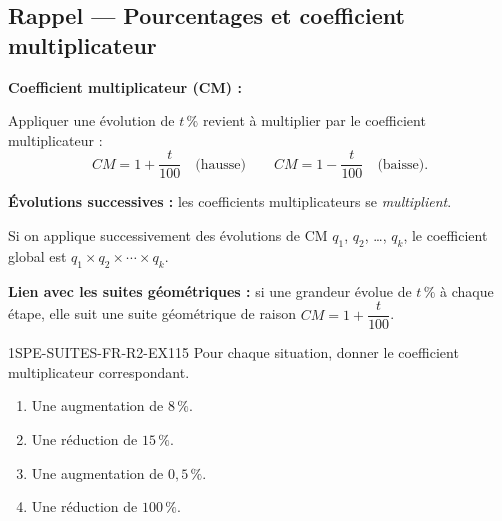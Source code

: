 

\subsection*{Rappel — Pourcentages et coefficient multiplicateur}

\textbf{Coefficient multiplicateur (CM) :}

Appliquer une évolution de $t\,\%$ revient à multiplier par le coefficient multiplicateur :
\[
  CM = 1 + \frac{t}{100} \quad \text{(hausse)} \qquad CM = 1 - \frac{t}{100} \quad \text{(baisse)}.
\]

\textbf{Évolutions successives :} les coefficients multiplicateurs se \emph{multiplient}.

Si on applique successivement des évolutions de CM $q_1$, $q_2$, \ldots, $q_k$, le coefficient global est $q_1 \times q_2 \times \cdots \times q_k$.

\textbf{Lien avec les suites géométriques :} si une grandeur évolue de $t\,\%$ à chaque étape, elle suit une suite géométrique de raison $CM = 1 + \dfrac{t}{100}$.


\begin{exercice}{1SPE-SUITES-FR-R2-EX1}{1}{5}
Pour chaque situation, donner le coefficient multiplicateur correspondant.
\begin{enumerate}
  \item Une augmentation de $8\,\%$.
  \item Une réduction de $15\,\%$.
  \item Une augmentation de $0{,}5\,\%$.
  \item Une réduction de $100\,\%$.
\end{enumerate}
\end{exercice}


